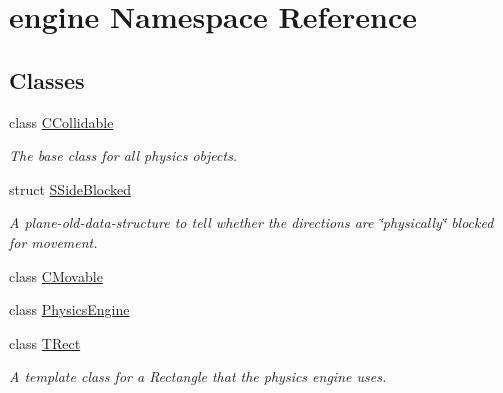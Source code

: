 \hypertarget{namespaceengine}{\section{engine Namespace Reference}
\label{namespaceengine}
}
\subsection*{Classes}
\begin{DoxyCompactItemize}
\item 
class \hyperlink{classengine_1_1CCollidable}{C\-Collidable}
\begin{DoxyCompactList}\small\item\em The base class for all physics objects. \end{DoxyCompactList}\item 
struct \hyperlink{structengine_1_1SSideBlocked}{S\-Side\-Blocked}
\begin{DoxyCompactList}\small\item\em A plane-\/old-\/data-\/structure to tell whether the directions are \char`\"{}physically\char`\"{} blocked for movement. \end{DoxyCompactList}\item 
class \hyperlink{classengine_1_1CMovable}{C\-Movable}
\item 
class \hyperlink{classengine_1_1PhysicsEngine}{Physics\-Engine}
\item 
class \hyperlink{classengine_1_1TRect}{T\-Rect}
\begin{DoxyCompactList}\small\item\em A template class for a Rectangle that the physics engine uses. \end{DoxyCompactList}\end{DoxyCompactItemize}
